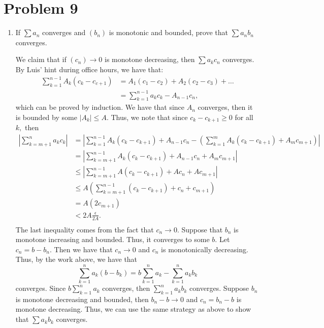 \documentclass[11pt]{article}
\begin{document}
\section*{Problem 9}
\begin{enumerate}
    \item 
\begin{problem}
If $\sum a_n$ converges and $(b_n)$ is monotonic and bounded, prove that $\sum a_nb_n$ converges.
\end{problem}
\begin{solution}
    We claim that if $(c_n)\to 0$ is monotone decreasing, then $\sum a_k c_n$ converges. By Luis' hint during office hours, we have that:
    \begin{align*}
    \sum_{k=1}^{n-1}A_k(c_k - c_{c+1}) &= A_1(c_1 -c_2) + A_2(c_2 - c_3)+ \dots\\
    &= \sum_{k=1}^{n-1}a_kc_k -  A_{n-1}c_{n},
    \end{align*} which can be proved by induction.
    We have that since $A_n$ converges, then it is bounded by some $|A_k|\leq A.$ Thus, we note that since $c_{k} - c_{k+1}\geq 0$ for all $k,$ then
    \begin{align*}
        \left|\sum_{k=m+1}^n a_k c_k\right| &= \left|\sum_{k=1}^{n-1}A_k(c_k - c_{k+1}) + A_{n-1}c_n - (\sum_{k=1}^mA_k(c_{k} - c_{k+1}) + A_mc_{m+1})\right|\\
        &= \left| \sum_{k=m+1}^{n-1}A_k(c_{k} - c_{k+1}) + A_{n-1}c_n + A_mc_{m+1}\right|\\
        &\leq \left| \sum_{k=m+1}^{n-1}A(c_{k} - c_{k+1}) + Ac_n + Ac_{m+1}\right|\\
        &\leq A\left(\sum_{k=m+1}^{n-1}(c_k - c_{k+1}) + c_n + c_{m+1}\right)\\
        &= A \left(2c_{m+1}\right)\\
        &< 2A\frac{\epsilon}{2A}.\\
    \end{align*}
    The last inequality comes from the fact that $c_n \to 0.$ Suppose that $b_n$ is monotone increasing and bounded. Thus, it converges to some $b.$ Let $c_n = b- b_n.$ Then we have that $c_n \to 0$ and $c_n$ is monotonically decreasing. Thus, by the work above, we have that 
    \[\sum_{k=1}^n a_k(b-b_k) = b\sum_{k=1}^na_k - \sum_{k=1}^n a_kb_k\] converges. Since $b\sum_{k=1}^n a_k$ converges, then $\sum_{k=1}^n a_k b_k$ converges. Suppose $b_n$ is monotone decreasing and bounded, then $b_n -b\to 0$ and  $c_n = b_n - b$ is monotone decreasing. Thus, we can use the same strategy as above to show that $\sum a_kb_k$ converges.

\end{solution}
\end{enumerate}
\end{document}
